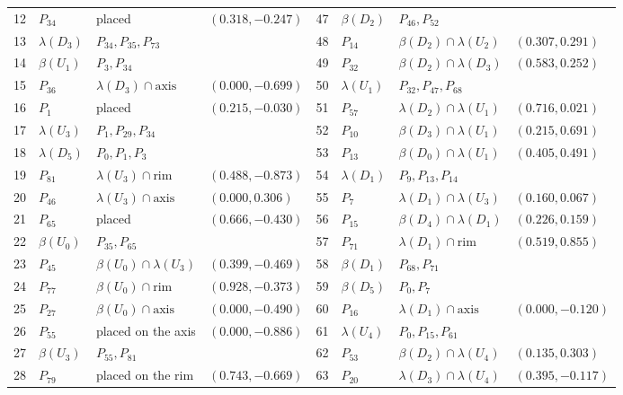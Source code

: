 \begin{table}[p]
\begin{tabular}{@{}rlll@{\qquad}rlll@{}}
12 & $P_{34}$ & placed & $(0.318, -0.247)$ & 47 & $\beta(D_{2})$ & $P_{46}, P_{52}$ &  \\
13 & $\lambda(D_{3})$ & $P_{34}, P_{35}, P_{73}$ &  & 48 & $P_{14}$ & $\beta(D_{2}) \cap \lambda(U_{2})$ & $(0.307, 0.291)$ \\
14 & $\beta(U_{1})$ & $P_{3}, P_{34}$ &  & 49 & $P_{32}$ & $\beta(D_{2}) \cap \lambda(D_{3})$ & $(0.583, 0.252)$ \\
15 & $P_{36}$ & $\lambda(D_{3}) \cap \text{axis}$ & $(0.000, -0.699)$ & 50 & $\lambda(U_{1})$ & $P_{32}, P_{47}, P_{68}$ &  \\
16 & $P_{1}$ & placed & $(0.215, -0.030)$ & 51 & $P_{57}$ & $\lambda(D_{2}) \cap \lambda(U_{1})$ & $(0.716, 0.021)$ \\
17 & $\lambda(U_{3})$ & $P_{1}, P_{29}, P_{34}$ &  & 52 & $P_{10}$ & $\beta(D_{3}) \cap \lambda(U_{1})$ & $(0.215, 0.691)$ \\
18 & $\lambda(D_{5})$ & $P_{0}, P_{1}, P_{3}$ &  & 53 & $P_{13}$ & $\beta(D_{0}) \cap \lambda(U_{1})$ & $(0.405, 0.491)$ \\
19 & $P_{81}$ & $\lambda(U_{3}) \cap \text{rim}$ & $(0.488, -0.873)$ & 54 & $\lambda(D_{1})$ & $P_{9}, P_{13}, P_{14}$ &  \\
20 & $P_{46}$ & $\lambda(U_{3}) \cap \text{axis}$ & $(0.000, 0.306)$ & 55 & $P_{7}$ & $\lambda(D_{1}) \cap \lambda(U_{3})$ & $(0.160, 0.067)$ \\
21 & $P_{65}$ & placed & $(0.666, -0.430)$ & 56 & $P_{15}$ & $\beta(D_{4}) \cap \lambda(D_{1})$ & $(0.226, 0.159)$ \\
22 & $\beta(U_{0})$ & $P_{35}, P_{65}$ &  & 57 & $P_{71}$ & $\lambda(D_{1}) \cap \text{rim}$ & $(0.519, 0.855)$ \\
23 & $P_{45}$ & $\beta(U_{0}) \cap \lambda(U_{3})$ & $(0.399, -0.469)$ & 58 & $\beta(D_{1})$ & $P_{68}, P_{71}$ &  \\
24 & $P_{77}$ & $\beta(U_{0}) \cap \text{rim}$ & $(0.928, -0.373)$ & 59 & $\beta(D_{5})$ & $P_{0}, P_{7}$ &  \\
25 & $P_{27}$ & $\beta(U_{0}) \cap \text{axis}$ & $(0.000, -0.490)$ & 60 & $P_{16}$ & $\lambda(D_{1}) \cap \text{axis}$ & $(0.000, -0.120)$ \\
26 & $P_{55}$ & placed on the axis & $(0.000, -0.886)$ & 61 & $\lambda(U_{4})$ & $P_{0}, P_{15}, P_{61}$ &  \\
27 & $\beta(U_{3})$ & $P_{55}, P_{81}$ &  & 62 & $P_{53}$ & $\beta(D_{2}) \cap \lambda(U_{4})$ & $(0.135, 0.303)$ \\
28 & $P_{79}$ & placed on the rim & $(0.743, -0.669)$ & 63 & $P_{20}$ & $\lambda(D_{3}) \cap \lambda(U_{4})$ & $(0.395, -0.117)$ \\

\end{tabular}
\end{table}
